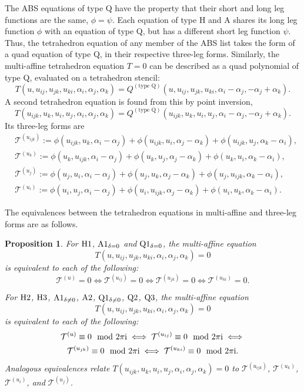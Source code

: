 \documentclass[10pt,a4paper]{amsart}
\newtheorem{Proposition}[Definition]{Proposition}
\numberwithin{equation}{section}
\begin{document}
The ABS equations of type Q have the property that their short and long leg functions are the same, $\phi=\psi$. Each equation of type H and A shares its long leg function $\phi$ with an equation of type Q, but has a different short leg function $\psi$.
Thus, the tetrahedron equation of any member of the ABS list takes the form of a quad equation of type Q, in their respective three-leg forms. Similarly, the multi-affine tetrahedron equation $T=0$ can be described as a quad polynomial of type Q, evaluated on a tetrahedron stencil:
\[ T(u,u_{ij},u_{jk},u_{ki},\alpha_i,\alpha_j,\alpha_k)
 = Q^{(\text{type Q})}(u,u_{ij},u_{jk},u_{ki},\alpha_i-\alpha_j,-\alpha_j+\alpha_k) . \]
A second tetrahedron equation is found from this by point inversion,
\[ T(u_{ijk},u_{k},u_{i},u_{j},\alpha_i,\alpha_j,\alpha_k)
 = Q^{(\text{type Q})}(u_{ijk},u_{k},u_{i},u_{j},\alpha_i-\alpha_j,-\alpha_j+\alpha_k) . \]
Its three-leg forms are
\begin{align}
 &\mathcal{T}^{(u_{ijk})}:= \phi(u_{ijk},u_{k},\alpha_i-\alpha_j) + \phi(u_{ijk},u_{i},\alpha_j-\alpha_k) + \phi(u_{ijk},u_{j},\alpha_k-\alpha_i) ,\label{tetra-uijk}
 \\
	&\mathcal{T}^{(u_{k})}:= \phi(u_{k},u_{ijk},\alpha_i-\alpha_j) + \phi(u_{k},u_{j},\alpha_j-\alpha_k) + \phi(u_{k},u_{i}, \alpha_k-\alpha_i) \label{tetra-uk} ,\\
	&\mathcal{T}^{(u_{j})}:= \phi(u_{j},u_{i},\alpha_i-\alpha_j) + \phi(u_{j},u_{k},\alpha_j-\alpha_k) + \phi(u_{j},u_{ijk}, \alpha_k-\alpha_i) \label{tetra-uj} ,\\
	&\mathcal{T}^{(u_{i})}:= \phi(u_{i},u_{j},\alpha_i-\alpha_j) + \phi(u_{i},u_{ijk},\alpha_j-\alpha_k) + \phi(u_{i},u_{k}, \alpha_k-\alpha_i) \label{tetra-ui} .
\end{align}

The equivalences between the tetrahedron equations in multi-affine and three-leg forms are as follows.
\begin{Proposition}
 For ${\rm H}1$, ${\rm A}1_{\delta=0}$ and ${\rm Q}1_{\delta=0}$, the multi-affine equation
 \[ T(u,u_{ij},u_{jk},u_{ki},\alpha_i,\alpha_j,\alpha_k) = 0\] is equivalent to each of the following:
 \[ \mathcal{T}^{(u)} = 0 \iff \mathcal{T}^{(u_{ij})} = 0 \iff \mathcal{T}^{(u_{jk})} = 0 \iff \mathcal{T}^{(u_{ki})} = 0 .\]

 For ${\rm H}2$, ${\rm H}3$, ${\rm A}1_{\delta\neq0}$, ${\rm A}2$, ${\rm Q}1_{\delta\neq0}$, ${\rm Q}2$, ${\rm Q}3$,
 the multi-affine equation
 \[ T(u,u_{ij},u_{jk},u_{ki},\alpha_i,\alpha_j,\alpha_k) = 0\] is equivalent to each of the following:
 \begin{gather*}
 \mathcal{T}^{(u)} \equiv 0 \mod 2 \pi {\rm i} \iff
 \mathcal{T}^{(u_{ij})} \equiv 0 \mod 2 \pi {\rm i} \iff \\
 \mathcal{T}^{(u_{jk})} \equiv 0 \mod 2 \pi {\rm i} \iff
 \mathcal{T}^{(u_{ki})} \equiv 0 \mod 2 \pi {\rm i} .
 \end{gather*}
Analogous equivalences relate $T(u_{ijk},u_{k},u_{i},u_{j},\alpha_i,\alpha_j,\alpha_k) = 0$ to $\mathcal{T}^{(u_{ijk})}$, $\mathcal{T}^{(u_{k})}$, $\mathcal{T}^{(u_{i})}$, and $\mathcal{T}^{(u_{j})}$.
\end{Proposition}
\end{document}
